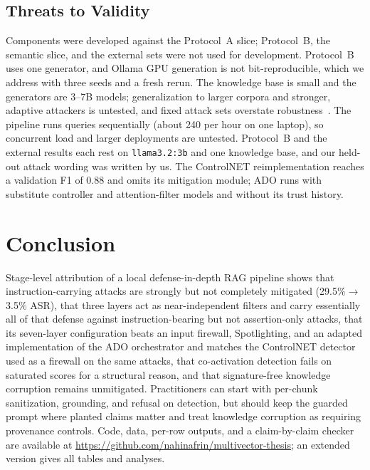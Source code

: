 \documentclass[conference,a4paper]{IEEEtran}
\begin{document}
\subsection{Threats to Validity}
Components were developed against the Protocol~A slice; Protocol~B, the semantic slice, and the external sets were not used for development. Protocol~B uses one generator, and Ollama GPU generation is not bit-reproducible, which we address with three seeds and a fresh rerun. The knowledge base is small and the generators are 3--7B models; generalization to larger corpora and stronger, adaptive attackers is untested, and fixed attack sets overstate robustness~\cite{nasr2025attacker}. The pipeline runs queries sequentially (about 240 per hour on one laptop), so concurrent load and larger deployments are untested. Protocol~B and the external results each rest on \texttt{llama3.2:3b} and one knowledge base, and our held-out attack wording was written by us. The ControlNET reimplementation reaches a validation F1 of 0.88 and omits its mitigation module; ADO runs with substitute controller and attention-filter models and without its trust history.

\section{Conclusion}
Stage-level attribution of a local defense-in-depth RAG pipeline shows that instruction-carrying attacks are strongly but not completely mitigated (29.5\%$\rightarrow$3.5\% ASR), that three layers act as near-independent filters and carry essentially all of that defense against instruction-bearing but not assertion-only attacks, that its seven-layer configuration beats an input firewall, Spotlighting, and an adapted implementation of the ADO orchestrator and matches the ControlNET detector used as a firewall on the same attacks, that co-activation detection fails on saturated scores for a structural reason, and that signature-free knowledge corruption remains unmitigated. Practitioners can start with per-chunk sanitization, grounding, and refusal on detection, but should keep the guarded prompt where planted claims matter and treat knowledge corruption as requiring provenance controls. Code, data, per-row outputs, and a claim-by-claim checker are available at \url{https://github.com/nahinafrin/multivector-thesis}; an extended version gives all tables and analyses.



\end{document}
